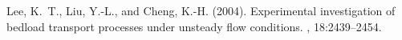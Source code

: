 \documentclass[11pt]{article}
\begin{document}
\begin{thebibliography}{3}
Lee, K.~T., Liu, Y.-L., and Cheng, K.-H. (2004).
\newblock Experimental investigation of bedload transport processes under
  unsteady flow conditions.
, 18:2439--2454.

%
%
%
%
%
%
%
%

\end{thebibliography}
\end{document}
